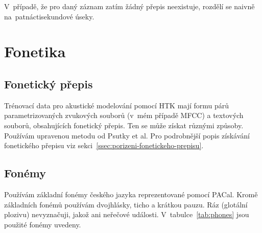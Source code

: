 V~případě, že pro daný záznam zatím žádný přepis neexistuje, rozdělí se naivně
na~patnáctisekundové úseky.

\section{Fonetika}
\label{sec:ac:fonetika}

\subsection{Fonetický přepis}

Trénovací data pro akustické modelování pomocí HTK mají formu párů
parametrizovaných zvukových souborů (v~mém případě MFCC) a textových souborů,
obsahujících fonetický přepis. Ten se může získat různými způsoby. Používám
upravenou metodu od Psutky et al.\cite{psutka2004development} Pro podrobnější
popis získávání fonetického přepisu viz
sekci~\ref{ssec:porizeni-fonetickeho-prepisu}.

\subsection{Fonémy}

Používám základní fonémy českého jazyka\cite{palkova1992fonetika}
reprezentované pomocí PACal\cite{nouza1997phonetic}. Kromě základních fonémů
používám dvojhlásky, ticho a krátkou pauzu. Ráz (glotální plozivu) nevyznačuji,
jakož ani neřečové události.
V~tabulce~\ref{tab:phones} jsou použité fonémy uvedeny.

